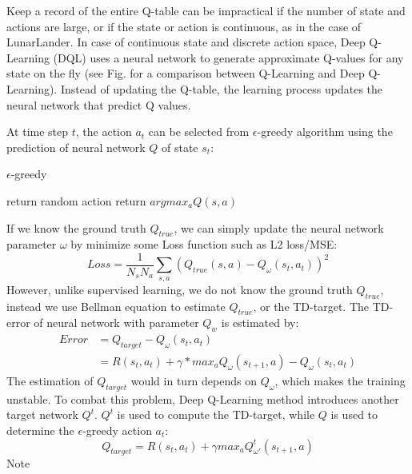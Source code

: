 \documentclass[conference]{IEEEtran}
\begin{document}
Keep a record of the entire Q-table can be impractical if the number of state and actions are large, or if the state or action is continuous, as in the case of LunarLander. In case of continuous state and discrete action space, Deep Q-Learning (DQL) uses a neural network to generate approximate Q-values for any state on the fly (see Fig. for a comparison between Q-Learning and Deep Q-Learning). Instead of updating the Q-table, the learning process updates the neural network that predict Q values.

At time step $t$, the action $a_t$ can be selected from $\epsilon$-greedy algorithm using the prediction of neural network $Q$ of state $s_t$:

\begin{algorithm}[h!]
	\caption{$\epsilon$-greedy}
	\begin{algorithmic}
		\State return random action
		\Else
		\State return $argmax_a Q(s, a)$
		\EndIf
		\EndFunction
	\end{algorithmic}
	\label{algo:seq}
\end{algorithm}

If we know the ground truth $Q_{true}$, we can simply update the neural network parameter $\omega$ by minimize some Loss function such as L2 loss/MSE:
\begin{equation}
Loss = \frac{1}{N_sN_a}\sum_{s,a}(Q_{true}(s, a) - Q_\omega(s_t, a_t))^2
\end{equation}
However, unlike supervised learning, we do not know the ground truth $Q_{true}$, instead we use Bellman equation to estimate $Q_{true}$, or the TD-target. The TD-error of neural network with parameter $Q_w$ is estimated by:
\begin{align}
Error &= Q_{target} - Q_\omega(s_t, a_t)  \\
&= R(s_t, a_t) + \gamma * max_a Q_{\omega}(s_{t+1}, a) - Q_\omega(s_t, a_t)
\end{align}
The estimation of $Q_{target}$ would in turn depends on $Q_\omega$, which makes the training unstable. To combat this problem, Deep Q-Learning method introduces another target network $Q^t$. $Q^t$ is used to compute the TD-target, while $Q$ is used to determine the 
$\epsilon$-greedy action $a_t$:
\begin{equation}
Q_{target} = R(s_t, a_t) + \gamma max_a Q^t_{\omega'}(s_{t+1}, a)
\label{eq:tdtarget}
\end{equation}
Note 
\end{document}
